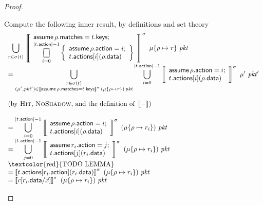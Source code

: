 \documentclass{article}
\newcommand{\pkt}{\mathit{pkt}}
\newcommand{\denote}[1]{\left\llbracket#1\right\rrbracket}
\newcommand{\matches}{\mathsf{matches}}
\newcommand{\action}{\mathsf{action}}
\newcommand{\actions}{\mathsf{actions}}
\newcommand{\keys}{\mathsf{keys}}
\newcommand{\data}{\mathsf{data}}
\newcommand{\assume}{\mathop{\mathsf{assume}}}
\newcommand{\choiceop}{\rotatebox[origin=c]{90}{$\sqsubset\!\!\!\sqsupset$}}
\DeclareMathOperator*{\bigchoice}{\scalerel*{\choiceop}{\sum}}
\begin{document}
\begin{proof}
\begin{enumerate}[align=left]
\begin{enumerate}
      Compute the following inner result, by definitions and set theory
      \[
      \begin{array}{>{\displaystyle}ll}
      \bigcup_{r \in \sigma(t)}\denote{\begin{array}{>{\displaystyle}l}
          \assume \rho.\matches = t.\keys;\\
          \bigchoice_{i=0}^{|t.\action| -1}
          \left\{\begin{array}{l}
          \assume \rho.\action = i;\\
          t.\actions[i](\rho.\data)
          \end{array}\right\}
      \end{array}}^\sigma~\mu\{\rho \mapsto r\}~\pkt\\
      = \bigcup_{
        \substack{r \in \sigma(t) \\
          (\mu',\pkt') \in \denote{\assume \rho.\matches = t.\keys}^\sigma\,(\mu\{\rho \mapsto r\})\,\pkt}}
      \bigcup_{i=0}^{|t.\action| -1}\denote{
       \begin{array}{l}
          \assume \rho.\action = i;\\
          t.\actions[i](\rho.\data)
      \end{array}}^\sigma~\mu'~\pkt'

      \\\\
      (\textrm{by \textsc{Hit}, \textsc{NoShadow}, and the definition of }\denote{-}) \\
      \\
      = \bigcup_{i=0}^{|t.\action| -1}\denote{
       \begin{array}{l}
          \assume \rho.\action = i;\\
          t.\actions[i](\rho.\data)
      \end{array}}^\sigma~(\mu\{\rho \mapsto r_i\})~\pkt \\
      = \bigcup_{j=0}^{|t.\action| -1}\denote{
       \begin{array}{l}
          \assume r_i.\action = j;\\
          t.\actions[j](r_i.\data)
      \end{array}}^\sigma~(\mu\{\rho \mapsto r_i\})~\pkt \\
      \textrm{\textcolor{red}{TODO LEMMA}} \\
      = \denote{t.\actions[r_i.\action](r_i.\data)}^\sigma~(\mu\{\rho \mapsto r_i\})~\pkt \\
      = \denote{c[r_i.\data/\vec x]}^\sigma~(\mu\{\rho \mapsto r_i\})~\pkt
      \end{array}\]


\end{enumerate}
\end{enumerate}
\end{proof}
\end{document}

